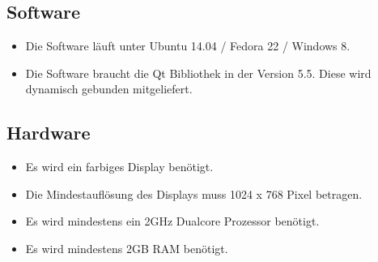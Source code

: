 \subsection{Software}
\begin{itemize}
\item Die Software läuft unter Ubuntu 14.04 / Fedora 22 / Windows 8. 
\item Die Software braucht die Qt Bibliothek in der Version 5.5. Diese wird dynamisch gebunden mitgeliefert.
\end{itemize}
\subsection{Hardware}
\begin{itemize}
\item Es wird ein farbiges Display benötigt. 
\item Die Mindestauflösung des Displays muss 1024 x 768 Pixel betragen.
\item Es wird mindestens ein 2GHz Dualcore Prozessor benötigt.
\item Es wird mindestens 2GB RAM benötigt.
\end{itemize}
\pagebreak